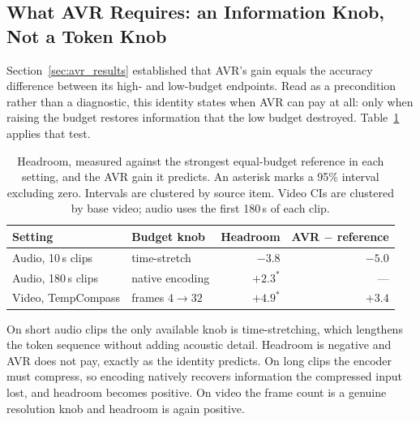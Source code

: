 \subsection{What AVR Requires: an Information Knob, Not a Token Knob}

Section~\ref{sec:avr_results} established that AVR's gain equals the
accuracy difference between its high- and low-budget endpoints. Read as
a precondition rather than a diagnostic, this identity states when AVR
can pay at all: only when raising the budget restores information that
the low budget destroyed. Table~\ref{tab:crossmodal_headroom} applies
that test.

\begin{table}[tb]
\centering\small
\caption{Headroom, measured against the strongest equal-budget
reference in each setting, and the AVR gain it predicts. An asterisk
marks a 95\% interval excluding zero. Intervals are clustered by
source item. Video CIs are clustered by base video; audio uses the
first 180\,s of each clip.}
\label{tab:crossmodal_headroom}
\begin{tabular}{llrr}
\toprule
Setting & Budget knob & Headroom & AVR $-$ reference \\
\midrule
Audio, 10\,s clips  & time-stretch      & $-3.8$          & $-5.0$ \\
Audio, 180\,s clips & native encoding   & $+2.3^*$        & --- \\
Video, TempCompass  & frames $4\to32$   & $+4.9^*$        & $+3.4$ \\
\bottomrule
\end{tabular}
\end{table}

On short audio clips the only available knob is time-stretching, which
lengthens the token sequence without adding acoustic detail. Headroom is
negative and AVR does not pay, exactly as the identity predicts. On long
clips the encoder must compress, so encoding natively recovers
information the compressed input lost, and headroom becomes positive.
On video the frame count is a genuine resolution knob and headroom is
again positive.

